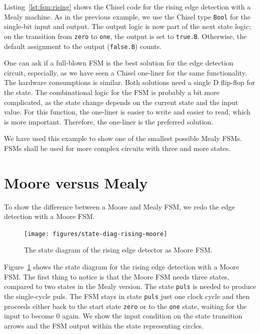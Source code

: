\documentclass[%
    10pt,
    headinclude, footexclude,
    openright, %
    notitlepage,
    cleardoubleempty,
    headsepline,
    pointlessnumbers,
    bibtotoc, idxtotoc,
    ]{scrbook}
\newcommand{\code}[1]{{\small{\texttt{#1}}}}
\begin{document}

Listing~\ref{lst:fsm:rising} shows the Chisel code for the rising edge detection
with a Mealy machine.
As in the previous example, we use the Chisel type \code{Bool} for the
single-bit input and output.
The output logic is now part of the next state logic; on the transition from
\code{zero} to \code{one}, the output is set to \code{true.B}. Otherwise,
the default assignment to the output (\code{false.B}) counts.

One can ask if a full-blown FSM is the best solution for the edge detection circuit,
especially, as we have seen a Chisel one-liner for the same functionality.
The hardware consumptions is similar. Both solutions need a single D flip-flop
for the state. The combinational logic for the FSM is probably a bit more complicated, as
the state change depends on the current state and the input value.
For this function, the one-liner is easier to write and easier to read,
which is more important. Therefore, the one-liner is the preferred solution.

We have used this example to show one of the smallest possible Mealy FSMs.
FSMs shall be used for more complex circuits with three and more states.

\section{Moore versus Mealy}

To show the difference between a Moore and Mealy FSM, we redo the edge
detection with a Moore FSM. 

\begin{figure}
  \centering
  \texttt{[image: figures/state-diag-rising-moore]}
  \caption{The state diagram of the rising edge detector as Moore FSM.}
  \label{fig:diag:rising:moore}
\end{figure}

Figure~\ref{fig:diag:rising:moore} shows the state diagram for the rising
edge detection with a Moore FSM. The first thing to notice is that the Moore FSM
needs three states, compared to two states in the Mealy version.
The state \code{puls} is needed to produce the single-cycle puls.
The FSM stays in state \code{puls} just one clock cycle and then
proceeds either back to the start state \code{zero} or to the \code{one}
state, waiting for the input to become 0 again.
We show the input condition on the state transition arrows and the
FSM output within the state representing circles.
\end{document}
